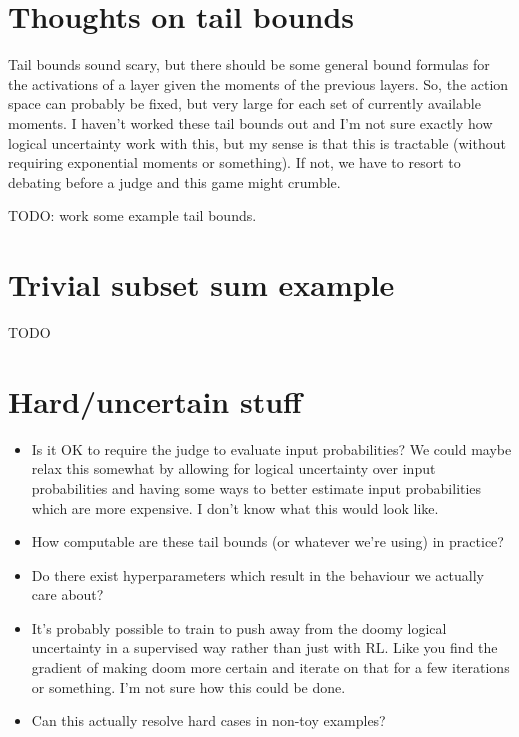 \documentclass{pset}
\begin{document}
\section{Thoughts on tail bounds}

Tail bounds sound scary, but there should be some general bound formulas for
the activations of a layer given the moments of the previous layers. So, the
action space can probably be fixed, but very large for each set of currently
available moments. I haven't worked these tail bounds out and I'm not sure
exactly how logical uncertainty work with this, but my sense is that this is
tractable (without requiring exponential moments or something). If not, we have
to resort to debating before a judge and this game might crumble.

TODO: work some example tail bounds.

\section{Trivial subset sum example}

TODO

\section{Hard/uncertain stuff}

\begin{itemize}
  \item Is it OK to require the judge to evaluate input probabilities? We could
    maybe relax this somewhat by allowing for logical uncertainty over input
    probabilities and having some ways to better estimate input probabilities
    which are more expensive. I don't know what this would look like.
  \item How computable are these tail bounds (or whatever we're using) in
    practice?
  \item Do there exist hyperparameters which result in the behaviour we actually
    care about?
  \item It's probably possible to train to push away from the doomy logical
    uncertainty in a supervised way rather than just with RL. 
    Like you find the gradient of making doom more certain and iterate on that
    for a few iterations or something.
    I'm not sure how this could be done.
  \item Can this actually resolve hard cases in non-toy examples?
\end{itemize}
\end{document}
